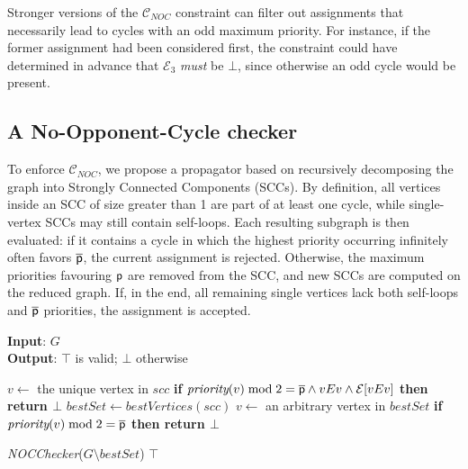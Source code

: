 \documentclass[runningheads]{llncs}
\begin{document}
Stronger versions of the $\mathcal{C}_{\!N\!O\!C}$ constraint can filter out assignments that necessarily lead to cycles with an odd maximum priority. For instance, if the former assignment had been considered first, the constraint could have determined in advance that $\mathcal{E}_3$ \textit{must} be $\bot$, since otherwise an odd cycle would be present.

\subsection{A No-Opponent-Cycle checker} \label{sec:nocchecker}
To enforce $\mathcal{C}_{\!N\!O\!C}$, we propose a propagator based on recursively decomposing the graph into Strongly Connected Components (SCCs). By definition, all vertices inside an SCC of size greater than 1 are part of at least one cycle, while single-vertex SCCs may still contain self-loops.
%
Each resulting subgraph is then evaluated: if it contains a cycle in which the highest priority occurring infinitely often favors $\overline{\mathsf{p}}$, the current assignment is rejected. Otherwise, the maximum priorities favouring $\mathsf{p}$ are removed from the SCC, and new SCCs are computed on the reduced graph.
%
If, in the end, all remaining single vertices lack both self-loops and $\overline{\mathsf{p}}$ priorities, the assignment is accepted.

\begin{algorithm}[htb]
\small
\caption{\textbf{\textit{NOCChecker}}}
\textbf{Input}: $G$ \\
\textbf{Output}: $\top$ is valid; $\bot$ otherwise
\begin{algorithmic}[1]
     \label{alg:noc-checker:breakingdown}
         \label{alg:noc-checker:single}
            \STATE $v \gets$ the unique vertex in $scc$
            \STATE \textbf{if }$\textit{priority}(v) \bmod 2 = \overline{\mathsf{p}} \land vEv \land \mathcal{E}[vEv]$ \textbf{then return $\bot$} \label{alg:noc-checker:self}  
        \ELSE
            \STATE $bestSet \gets \textit{bestVertices}(scc)$ \label{alg:noc-checker:best}
            \STATE $v \gets$ an arbitrary vertex in $bestSet$
            \STATE \textbf{if }$\textit{priority}(v) \bmod 2 = \overline{\mathsf{p}}$ \textbf{then return $\bot$} \label{alg:noc-checker:opponent}  

            \STATE \textit{NOCChecker}($G \setminus bestSet$) \label{alg:noc-checker:recursion}
        \ENDIF
    \ENDFOR
    \RETURN $\top$
\end{algorithmic}
\label{alg:noc-checker}
\end{algorithm}
\end{document}
